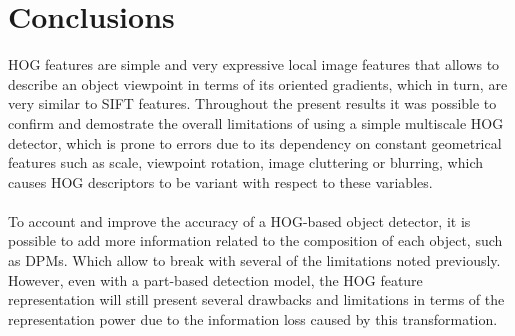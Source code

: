 \documentclass[10pt,twocolumn,letterpaper]{article}
\begin{document}
\section{Conclusions}
HOG features are simple and very expressive local image features that allows to describe an object viewpoint in terms of its oriented gradients, which in turn, are very similar to SIFT features. Throughout the present results it was possible to confirm and demostrate the overall limitations of using a simple multiscale HOG detector, which is prone to errors due to its dependency on constant geometrical features such as scale, viewpoint rotation, image cluttering or blurring, which causes HOG descriptors to be variant with respect to these variables. 
\\
\\
To account and improve the accuracy of a HOG-based object detector, it is possible to add more information related to the composition of each object, such as DPMs. Which allow to break with several of the limitations noted previously. However, even with a part-based detection model, the HOG feature representation will still present several drawbacks and limitations in terms of the representation power due to the information loss caused by this transformation.

{\small


}
\end{document}
